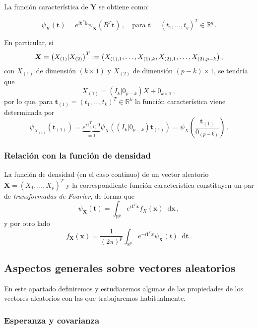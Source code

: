\begin{nprop}
  La función característica de $\boldsymbol Y$ se obtiene como:
  
  \[
  \psi_{\boldsymbol Y}(\boldsymbol t) = e^{i\boldsymbol t^T \boldsymbol b} \psi_{\boldsymbol X}(B^T \boldsymbol t)\,, \quad \text{para }\boldsymbol t = (t_1,\dots,t_q)^T \in \mathbb R^q\,.
  \]
\end{nprop}

  En particular, si \[ \boldsymbol{X}= \left( X_{(1)} | X_{(2)}\right)^T := \left(X_{(1),1}, \dots, X_{(1),k}, X_{(2),1}, \dots, X_{(2),p-k}\right),\] con $X_{(1)}$ de dimensión $(k\times1)$ y $X_{(2)}$ de dimensión $(p-k) \times 1$, se tendría que
  \[
X_{(1)} = \left( I_k | 0_{p-k} \right)X + 0_{k\times 1}\,,
\]
por lo que, para $\boldsymbol t_{(1)} = (t_1,\dots,t_k)^T \in \mathbb R^k$ la función característica viene determinada por
\[
\psi_{X_{(1)}}\left(\boldsymbol t_{(1)}\right) = \underbrace{e^{i\boldsymbol t_{(1)}^T 0}}_{=1} \psi_X\left(\left( I_k | 0_{p-k} \right)\boldsymbol t_{(1)}\right) = \psi_X\left(\frac{\boldsymbol t_{(1)}}{0_{(p-k)}}\right)\,.
\]

\subsubsection{Relación con la función de densidad}

La función de densidad (en el caso continuo) de un vector aleatorio $\boldsymbol X = (X_1,\dots,X_p)^T$ y la correspondiente función característica constituyen un par de \emph{transformadas de Fourier}, de forma que
\[
\psi_{\boldsymbol X}(\boldsymbol t) = \int_{\mathbb R ^p} e^{i \boldsymbol t^T \boldsymbol x} f_X(\boldsymbol x) \mathop{}\!\mathrm{d}\boldsymbol x\,,
\]
y por otro lado
\[
f_{\boldsymbol X}(\boldsymbol x) =  \dfrac{1}{(2\pi)^p} \int_{\mathbb R^p} e^{- i \boldsymbol t^T x} \psi_{\boldsymbol X}(t) \mathop{}\!\mathrm{d}\boldsymbol t\,.
\]


\subsection{Aspectos generales sobre vectores aleatorios}

En este apartado definiremos y estudiaremos algunas de las propiedades de los vectores aleatorios con las que trabajaremos habitualmente.

\subsubsection{Esperanza y covarianza}

